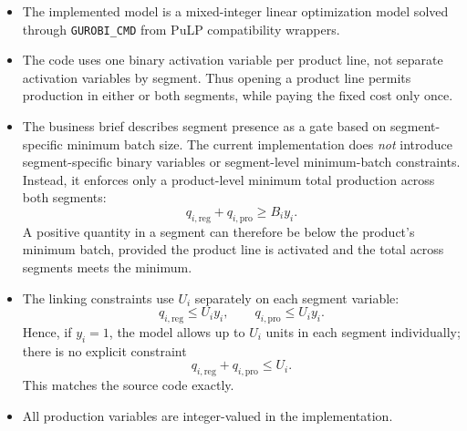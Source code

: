 \begin{itemize}
    \item The implemented model is a mixed-integer linear optimization model solved through \texttt{GUROBI\_CMD} from PuLP compatibility wrappers.
    \item The code uses one binary activation variable per product line, not separate activation variables by segment. Thus opening a product line permits production in either or both segments, while paying the fixed cost only once.
    \item The business brief describes segment presence as a gate based on segment-specific minimum batch size. The current implementation does \emph{not} introduce segment-specific binary variables or segment-level minimum-batch constraints. Instead, it enforces only a product-level minimum total production across both segments:
    \[
    q_{i,\mathrm{reg}} + q_{i,\mathrm{pro}} \ge B_i y_i.
    \]
    A positive quantity in a segment can therefore be below the product's minimum batch, provided the product line is activated and the total across segments meets the minimum.
    \item The linking constraints use $U_i$ separately on each segment variable:
    \[
    q_{i,\mathrm{reg}} \le U_i y_i,\qquad q_{i,\mathrm{pro}} \le U_i y_i.
    \]
    Hence, if $y_i=1$, the model allows up to $U_i$ units in each segment individually; there is no explicit constraint
    \[
    q_{i,\mathrm{reg}} + q_{i,\mathrm{pro}} \le U_i.
    \]
    This matches the source code exactly.
    \item All production variables are integer-valued in the implementation.
\end{itemize}
